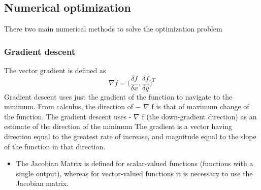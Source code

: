 \subsection{Numerical optimization}
There two main numerical methods to solve the optimization problem 
\subsubsection{Gradient descent}
The vector gradient is defined as
\begin{equation}
    \nabla f = \Big(\frac{\delta f}{\delta x}, \frac{\delta f}{\delta y} \Big)^T
\end{equation}
Gradient descent uses just the gradient of the function to navigate to the minimum. From
calculus, the direction of − $\nabla$ f is that of maximum change of the function. The gradient descent uses - $\nabla$ f (the down-gradient direction) as an estimate of the direction of the minimum
The gradient is a vector having direction equal to the greatest rate of increase, and magnitude equal to the slope of the function in that direction.
\begin{itemize}
    \item  The Jacobian Matrix is defined for scalar-valued functions (functions with a single output), whereas for vector-valued functions it is necessary to use the Jacobian matrix.
\end{itemize}
